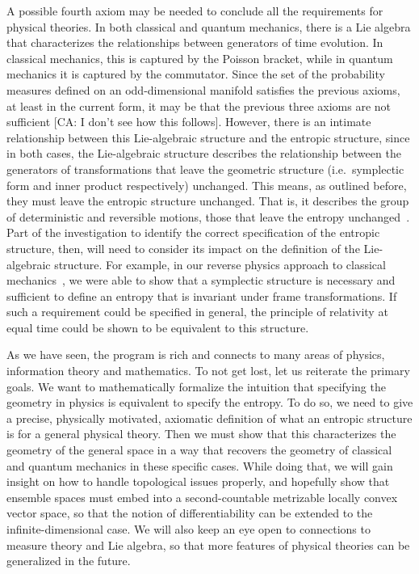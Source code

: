 A possible fourth axiom may be needed to conclude all the requirements for physical theories. In both classical and quantum mechanics, there is a Lie algebra that characterizes the relationships between generators of time evolution. In classical mechanics, this is captured by the Poisson bracket, while in quantum mechanics it is captured by the commutator. Since the set of the probability measures defined on an odd-dimensional manifold satisfies the previous axioms, at least in the current form, it may be that the previous three axioms are not sufficient [CA: I don't see how this follows]. However, there is an intimate relationship between this Lie-algebraic structure and the entropic structure, since in both cases, the Lie-algebraic structure describes the relationship between the generators of transformations that leave the geometric structure (i.e.~symplectic form and inner product respectively) unchanged.  This means, as outlined before, they must leave the entropic structure unchanged. That is, it describes the group of deterministic and reversible motions, those that leave the entropy unchanged~\cite{aop-HamConsInfoEnt,aop-HamQuantInfo,aop-book}. Part of the investigation to identify the correct specification of the entropic structure, then, will need to consider its impact on the definition of the Lie-algebraic structure. For example, in our reverse physics approach to classical mechanics~\cite{aop-book,Carcassi:2022bpm}, we were able to show that a symplectic structure is necessary and sufficient to define an entropy that is invariant under frame transformations. If such a  requirement could be specified in general, the principle of relativity at equal time could be shown to be equivalent to this structure.

As we have seen, the program is rich and connects to many areas of physics, information theory and mathematics. To not get lost, let us reiterate the primary goals. We want to mathematically formalize the intuition that specifying the geometry in physics is equivalent to specify the entropy. To do so, we need to give a precise, physically motivated, axiomatic definition of what an entropic structure is for a general physical theory. Then we must show that this characterizes the geometry of the general space in a way that recovers the geometry of classical and quantum mechanics in these specific cases. While doing that, we will gain insight on how to handle topological issues properly, and hopefully show that ensemble spaces must embed into a second-countable metrizable locally convex vector space, so that the notion of differentiability can be extended to the infinite-dimensional case. We will also keep an eye open to connections to measure theory and Lie algebra, so that more features of physical theories can be generalized in the future.



